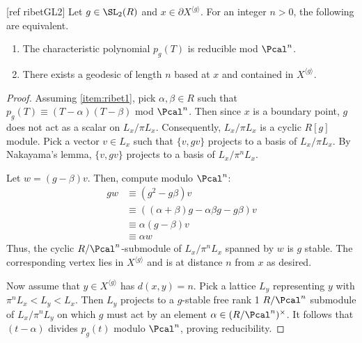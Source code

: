 \documentclass{amsart}
\begin{document}
\begin{prop}\label{prop:ribetgl2}[ref ribetGL2]
	Let $g\in \SL_{2}(R)$ and $x \in \partial X^{\langle g \rangle }$. For an integer $n>0$, the following are equivalent.
	\begin{enumerate}
		\item\label{item:ribet1} The characteristic polynomial $p_{g}(T)$ is reducible mod $\Pcal^{n}$.
		\item\label{item:ribet2} There exists a geodesic of length $n$ based at $x$ and contained in $X^{\langle g \rangle}$.
	\end{enumerate}
\end{prop}
\begin{proof}
	Assuming \cref{item:ribet1}, pick $\alpha,\beta \in R$ such that $p_{g}(T) \equiv (T-\alpha)(T-\beta)$ mod $\Pcal^{n}$. Then since $x$ is a boundary point, $g$ does not act as a scalar on $L_{x}/\pi L_{x}$. Consequently, $L_{x}/\pi L_{x}$ is a cyclic $R[g]$ module. Pick a vector $v \in L_{x}$ such that $\{v, gv\}$ projects to a basis of $L_{x}/\pi L_{x}$. By Nakayama's lemma, $\{v,gv\}$ projects to a basis of $L_{x}/\pi^{n}L_{x}$.

	Let $w = (g-\beta)v$. Then, compute modulo $\Pcal^{n}$:
	\begin{align*}
		g w & \equiv (g^{2} -g \beta ) v                            \\
		    & \equiv ((\alpha +\beta )g -\alpha\beta g - g\beta  )v \\
		    & \equiv \alpha(g-\beta )v                              \\
		    & \equiv \alpha w
	\end{align*}
	Thus, the cyclic $R/\Pcal^{n}$-submodule of $L_{x}/\pi^{n}L_{x}$ spanned by $w$ is $g$ stable. The corresponding vertex lies in $X^{\langle g \rangle}$ and is at distance $n$ from $x$ as desired.

	Now assume that $y \in X^{\langle g \rangle }$ has $d(x,y)=n$. Pick a lattice
	$L_y$ representing $y$ with $\pi^n L_x < L_y <L_x$. Then $L_y$ projects to a
	$g$-stable free rank 1 $R/\Pcal^n$ submodule of $L_x / \pi^n L_y$ on which $g$
	must act by an element $\alpha \in (R/\Pcal^n)^\times$. It follows that
	$(t-\alpha)$ divides $p_g(t)$ modulo $\Pcal^n$, proving reducibility.
\end{proof}
\end{document}
